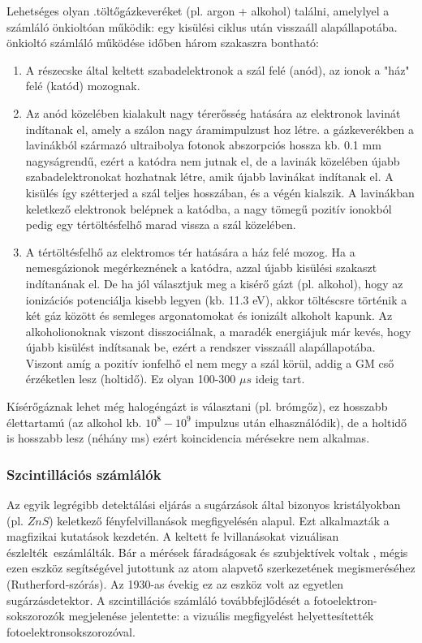 \documentclass[../main.tex]{subfiles}
\begin{document}
Lehetséges olyan .töltőgázkeveréket (pl. argon + alkohol) találni, amelylyel a számláló önkioltóan működik: egy kisülési ciklus után visszaáll alapállapotába.
önkioltó számláló működése időben három szakaszra bontható:
\begin{enumerate}
    \item A részecske által keltett szabadelektronok a szál felé (anód), az ionok a "ház" felé (katód) mozognak.
    \item Az anód közelében kialakult nagy térerősség hatására az elektronok lavinát indítanak el, amely a szálon nagy áramimpulzust hoz létre. 
          a gázkeverékben a lavinákból származó ultraibolya fotonok abszorpciós hossza kb. 0.1 mm nagyságrendű, ezért a katódra nem jutnak el, de a lavinák
          közelében újabb szabadelektronokat hozhatnak létre, amik újabb lavinákat indítanak el. A kisülés így szétterjed a szál teljes hosszában, és a végén kialszik.
          A lavinákban keletkező elektronok belépnek a katódba, a nagy tömegű pozitív ionokból pedig egy tértöltésfelhő marad vissza a szál közelében.
    \item A tértöltésfelhő az elektromos tér hatására a ház felé mozog. Ha a nemesgázionok megérkeznének a katódra, azzal újabb kisülési szakaszt indítanának el.
          De ha jól választjuk meg a kisérő gázt (pl. alkohol), hogy az ionizációs potenciálja kisebb legyen (kb. 11.3 eV), akkor töltéscsre történik a két gáz között 
          és semleges argonatomokat és ionizált alkoholt kapunk. Az alkoholionoknak viszont disszociálnak, a maradék energiájuk már kevés, hogy újabb kisülést indítsanak be,
          ezért a rendszer visszaáll alapállapotába. Viszont amíg a pozitív ionfelhő el nem megy a szál körül, addig a GM cső érzéketlen lesz (holtidő). Ez olyan 100-300 $\mu s$ ideig tart.
\end{enumerate}

Kísérőgáznak lehet még halogéngázt is választani (pl. brómgőz), ez hosszabb élettartamú (az alkohol kb. $10^8-10^9$ impulzus után elhasználódik),
de a holtidő is hosszabb lesz (néhány ms) ezért koincidencia mérésekre nem alkalmas.

\subsubsection{Szcintillációs számlálók}
Az egyik legrégibb detektálási eljárás a sugárzások által bizonyos kristályokban (pl. $ZnS$) keletkező fényfelvillanások megfigyelésén alapul. Ezt alkalmazták a magfizikai kutatások kezdetén.
A keltett fe lvillanásokat vizuálisan észlelték~eszámlálták. Bár a mérések fáradságosak és szubjektívek
voltak , mégis ezen eszköz segítségével jutottunk az atom alapvető szerkezetének megismeréséhez (Rutherford-szórás). Az 1930-as évekig ez az eszköz
volt az egyetlen sugárzásdetektor.
A szcintillációs számláló továbbfejlődését a fotoelektron-sokszorozók
megjelenése jelentette: a vizuális megfigyelést helyettesítették fotoelektronsokszorozóval.
\end{document}
